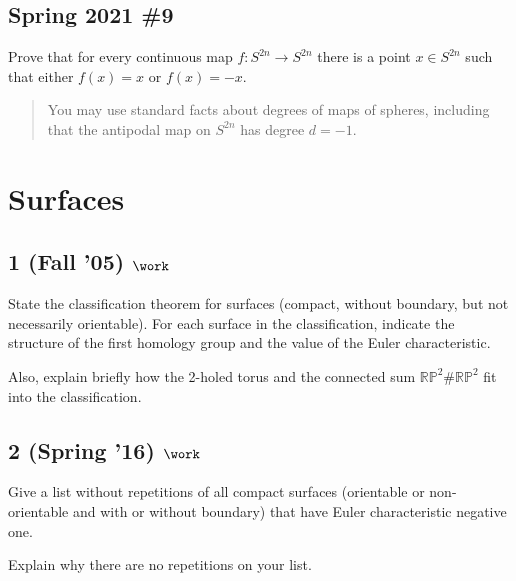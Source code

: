 \hypertarget{spring-2021-9}{%
\subsection{Spring 2021 \#9}\label{spring-2021-9}}

\begin{problem}[Spring 2021, 9]

Prove that for every continuous map \(f: S^{2n} \to S^{2n}\) there is a
point \(x\in S^{2n}\) such that either \(f(x) = x\) or \(f(x) = -x\).

\begin{quote}
You may use standard facts about degrees of maps of spheres, including
that the antipodal map on \(S^{2n}\) has degree \(d=-1\).
\end{quote}

\end{problem}

\hypertarget{surfaces}{%
\section{Surfaces}\label{surfaces}}

\hypertarget{fall-05-work-1}{%
\subsection{\texorpdfstring{1 (Fall '05)
\(\work\)}{1 (Fall '05) \textbackslash work}}\label{fall-05-work-1}}

State the classification theorem for surfaces (compact, without
boundary, but not necessarily orientable). For each surface in the
classification, indicate the structure of the first homology group and
the value of the Euler characteristic.

Also, explain briefly how the 2-holed torus and the connected sum
\({\mathbb{RP}}^2 \# {\mathbb{RP}}^2\) fit into the classification.

\hypertarget{spring-16-work-2}{%
\subsection{\texorpdfstring{2 (Spring '16)
\(\work\)}{2 (Spring '16) \textbackslash work}}\label{spring-16-work-2}}

Give a list without repetitions of all compact surfaces (orientable or
non-orientable and with or without boundary) that have Euler
characteristic negative one.

Explain why there are no repetitions on your list.

